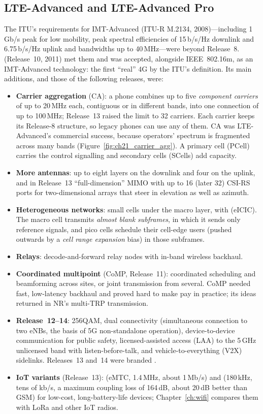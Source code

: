 \subsection{LTE-Advanced and LTE-Advanced Pro}

The ITU's requirements for IMT-Advanced (ITU-R M.2134, 2008)---including 1\,Gb/s peak for low
mobility, peak spectral efficiencies of 15\,b/s/Hz downlink and 6.75\,b/s/Hz uplink and bandwidths up
to 40\,MHz---were beyond Release~8.  (Release~10, 2011) met them and was accepted,
alongside IEEE~802.16m, as an IMT-Advanced technology: the first ``real'' 4G by the ITU's
definition. Its main additions, and those of the following releases, were:
\begin{itemize}
\item \textbf{Carrier aggregation} (CA): a phone combines up to five \emph{component carriers} of up
to 20\,MHz each, contiguous or in different bands, into one connection of up to 100\,MHz; Release~13
raised the limit to 32 carriers. Each carrier keeps its Release-8 structure, so legacy phones can use
any of them. CA was LTE-Advanced's commercial success, because operators' spectrum is fragmented
across many bands (Figure~\ref{fig:ch21_carrier_agg}). A primary cell (PCell) carries the control
signalling and secondary cells (SCells) add capacity.
\item \textbf{More antennas}: up to eight layers on the downlink and four on the uplink, and in
Release~13 ``full-dimension'' MIMO with up to 16 (later 32) CSI-RS ports for two-dimensional arrays
that steer in elevation as well as azimuth.
\item \textbf{Heterogeneous networks}: small cells under the macro layer, with
 (eICIC). The macro cell transmits \emph{almost
blank subframes}, in which it sends only reference signals, and pico cells schedule their cell-edge
users (pushed outwards by a \emph{cell range expansion} bias) in those subframes.
\item \textbf{Relays}: decode-and-forward relay nodes with in-band wireless backhaul.
\item \textbf{Coordinated multipoint} (CoMP, Release~11): coordinated scheduling and beamforming
across sites, or joint transmission from several. CoMP needed fast, low-latency backhaul and proved
hard to make pay in practice; its ideas returned in NR's multi-TRP transmission.
\item \textbf{Release~12--14}: 256QAM, dual connectivity (simultaneous connection to two eNBs, the
basis of 5G non-standalone operation), device-to-device communication for public safety,
licensed-assisted access (LAA) to the 5\,GHz unlicensed band with listen-before-talk, and
vehicle-to-everything (V2X) sidelinks. Releases~13 and~14 were branded .
\item \textbf{IoT variants} (Release~13):  (eMTC, 1.4\,MHz, about 1\,Mb/s) and
 (180\,kHz, tens of kb/s, a maximum coupling loss of 164\,dB, about 20\,dB better than
GSM) for low-cost, long-battery-life devices; Chapter~\ref{ch:wifi} compares them with LoRa and other
IoT radios.
\end{itemize}
